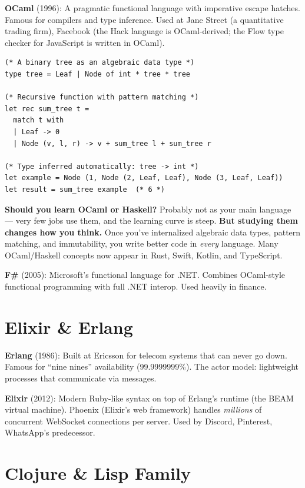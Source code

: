 \documentclass[11pt, letterpaper]{article}
\begin{document}
\textbf{OCaml} (1996): A pragmatic functional language with imperative escape hatches. Famous for compilers and type inference. Used at Jane Street (a quantitative trading firm), Facebook (the Hack language is OCaml-derived; the Flow type checker for JavaScript is written in OCaml).

\begin{lstlisting}[style=code, caption={OCaml: pattern matching and recursion}]
(* A binary tree as an algebraic data type *)
type tree = Leaf | Node of int * tree * tree

(* Recursive function with pattern matching *)
let rec sum_tree t =
  match t with
  | Leaf -> 0
  | Node (v, l, r) -> v + sum_tree l + sum_tree r

(* Type inferred automatically: tree -> int *)
let example = Node (1, Node (2, Leaf, Leaf), Node (3, Leaf, Leaf))
let result = sum_tree example  (* 6 *)
\end{lstlisting}

\textbf{Should you learn OCaml or Haskell?} Probably not as your main language --- very few jobs use them, and the learning curve is steep. \textbf{But studying them changes how you think.} Once you've internalized algebraic data types, pattern matching, and immutability, you write better code in \emph{every} language. Many OCaml/Haskell concepts now appear in Rust, Swift, Kotlin, and TypeScript.

\textbf{F\#} (2005): Microsoft's functional language for .NET. Combines OCaml-style functional programming with full .NET interop. Used heavily in finance.

\section*{Elixir \& Erlang}

\textbf{Erlang} (1986): Built at Ericsson for telecom systems that can never go down. Famous for ``nine nines'' availability (99.9999999\%). The actor model: lightweight processes that communicate via messages.

\textbf{Elixir} (2012): Modern Ruby-like syntax on top of Erlang's runtime (the BEAM virtual machine). Phoenix (Elixir's web framework) handles \emph{millions} of concurrent WebSocket connections per server. Used by Discord, Pinterest, WhatsApp's predecessor.

\section*{Clojure \& Lisp Family}
\end{document}
